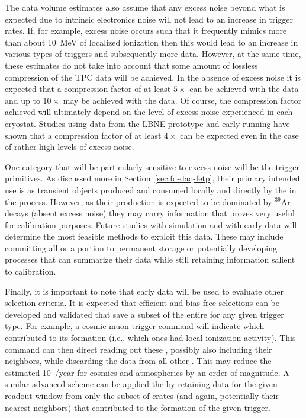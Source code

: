 The data volume estimates also assume that any excess noise beyond
what is expected due to intrinsic electronics noise will not lead to
an increase in trigger rates. 
If, for example, excess noise occurs such that it frequently mimics
more than about \SI{10}{\MeV} of localized ionization then this would
lead to an increase in various types of triggers and subsequently more
data.
However, at the same time, these estimates do not take into account
that some amount of lossless compression of the TPC data will be
achieved. 
In the absence of excess noise it is expected that a compression
factor of at least $5\times$ can be achieved with the \single data and up
to $10\times$ may be achieved with the \dual data. 
Of course, the compression factor achieved will ultimately depend on
the level of excess noise experienced in each 
cryostat. 
Studies using data from the LBNE  prototype and early \microboone
running have shown that a compression factor of at least $4\times$ can
be expected even in the case of rather high levels of excess noise.

One category that will be particularly sensitive to excess noise will
be the trigger primitives. 
As discussed more in Section~\ref{sec:fd-daq-fetp}, their primary
intended use is as transient objects produced and consumed locally
and directly by the  in the  process. 
However, as their production is expected to be dominated by $^{39}$Ar
decays (absent excess noise) they may carry information that proves
very useful for calibration purposes. 
Future studies with simulation and with early data will determine 
 the most feasible methods to exploit this data. 
These may include committing all or a portion to permanent storage or
potentially developing processes that can summarize their data while
still retaining information salient to calibration.

Finally, it is important to note that early data will be used to
evaluate other selection criteria. 
It is expected that efficient and bias-free selections can be
developed and validated that save a subset of the entire
 for any given trigger type. 
For example, a cosmic-muon trigger command will indicate which 
contributed to its formation (i.e., which ones had local ionization activity). 
This command can then direct reading out these , possibly also
including their neighbors, while discarding the data from all other
. 
This may reduce the estimated \SI{10}{\PB/year} for cosmics and
atmospherics by an order of magnitude. 
A similar advanced scheme can be applied the 
 by retaining data for the given readout window from
only the subset of  crates (and again, potentially their
nearest neighbors) that contributed to the formation of the given
trigger.



